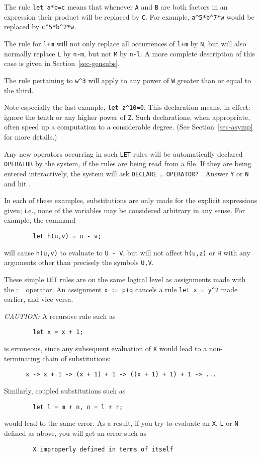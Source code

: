 The rule \texttt{let a*b=c} means that whenever \texttt{A} and \texttt{B} are both
factors in an expression their product will be replaced by \texttt{C}.  For
example, \texttt{a\textasciicircum5*b\textasciicircum7*w} would be replaced by
\texttt{c\textasciicircum5*b\textasciicircum2*w}.

The rule for \texttt{l+m} will not only replace all occurrences of \texttt{l+m}
by \texttt{N}, but will also normally replace \texttt{L} by \texttt{n-m}, but not
\texttt{M} by \texttt{n-l}.  A more complete description of this case is given
in Section~\ref{sec-gensubs}.

The rule pertaining to \texttt{w\textasciicircum3} will apply to any power of \texttt{W}
greater than or equal to the third.

Note especially the last example, \texttt{let z\textasciicircum10=0}.  This declaration
means, in effect: ignore the tenth or any higher power of \texttt{Z}.  Such
declarations, when appropriate, often speed up a computation to a
considerable degree. (See
Section~\ref{sec-asymp} for more details.)

Any new operators occurring in such \texttt{LET} rules will be automatically
declared \texttt{OPERATOR} by the system, if the rules are being read from a
file.  If they are being entered interactively, the system will ask
\texttt{DECLARE} \ldots{} \texttt{OPERATOR?} .  Answer \texttt{Y} or \texttt{N} and hit
.

In each of these examples, substitutions are only made for the explicit
expressions given; i.e., none of the variables may be considered arbitrary
in any sense. For example, the command
\begin{verbatim}
        let h(u,v) = u - v;
\end{verbatim}
will cause \texttt{h(u,v)} to evaluate to \texttt{U - V}, but will not affect
\texttt{h(u,z)} or \texttt{H} with any arguments other than precisely the
symbols \texttt{U,V}.

These simple \texttt{LET} rules are on the same logical level as assignments
made with the := operator.  An assignment \texttt{x := p+q} cancels a rule
\texttt{let x = y\textasciicircum2} made earlier, and vice versa.

\textit{CAUTION:} A recursive rule such as
\begin{verbatim}
        let x = x + 1;
\end{verbatim}
is erroneous, since any subsequent evaluation of \texttt{X} would lead to a
non-terminating chain of substitutions:
\begin{verbatim}
      x -> x + 1 -> (x + 1) + 1 -> ((x + 1) + 1) + 1 -> ...
\end{verbatim}
Similarly, coupled substitutions such as
\begin{verbatim}
        let l = m + n, n = l + r;
\end{verbatim}
would lead to the same error. As a result, if you try to evaluate an \texttt{X},
\texttt{L} or \texttt{N} defined as above, you will get an error such as
\begin{verbatim}
        X improperly defined in terms of itself
\end{verbatim}

